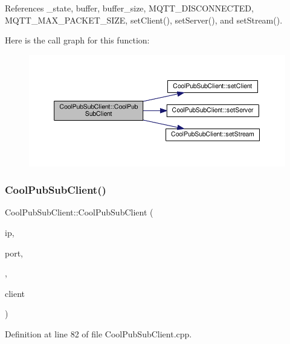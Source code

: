 References \+\_\+state, buffer, buffer\+\_\+size, M\+Q\+T\+T\+\_\+\+D\+I\+S\+C\+O\+N\+N\+E\+C\+T\+ED, M\+Q\+T\+T\+\_\+\+M\+A\+X\+\_\+\+P\+A\+C\+K\+E\+T\+\_\+\+S\+I\+ZE, set\+Client(), set\+Server(), and set\+Stream().

Here is the call graph for this function\+:\nopagebreak
\begin{figure}[H]
\begin{center}
\leavevmode
\includegraphics[width=350pt]{d8/d4b/class_cool_pub_sub_client_a3e7d7fa4b55e36f0ac8912335993d650_cgraph}
\end{center}
\end{figure}
\mbox{\label{class_cool_pub_sub_client_afc703702b40ba925377d0b9cd401319e}} 
\subsubsection{\texorpdfstring{Cool\+Pub\+Sub\+Client()}{CoolPubSubClient()}\hspace{0.1cm}{\footnotesize\ttfamily [9/14]}}
{\footnotesize\ttfamily Cool\+Pub\+Sub\+Client\+::\+Cool\+Pub\+Sub\+Client (\begin{DoxyParamCaption}\item[{uint8\+\_\+t $\ast$}]{ip,  }\item[{uint16\+\_\+t}]{port,  }\item[{\hyperlink{class_cool_pub_sub_client_a021ec75e9fbaf658370b8005ccfddc14}{M\+Q\+T\+T\+\_\+\+C\+A\+L\+L\+B\+A\+C\+K\+\_\+\+S\+I\+G\+N\+A\+T\+U\+RE}}]{,  }\item[{Client \&}]{client }\end{DoxyParamCaption})}



Definition at line 82 of file Cool\+Pub\+Sub\+Client.\+cpp.



